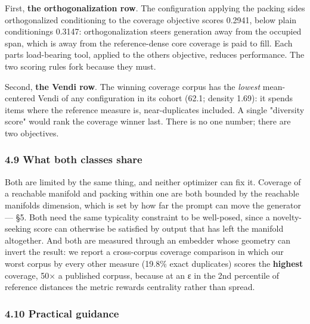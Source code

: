 \documentclass[
  10pt,
]{article}
\theoremstyle{plain}
\theoremstyle{definition}
\begin{document}
First, \textbf{the orthogonalization row}. The configuration applying
the packing side\textquotesingle s orthogonalized conditioning to the
coverage objective scores 0.2941, below plain
conditioning\textquotesingle s 0.3147: orthogonalization steers
generation away from the occupied span, which is away from the
reference-dense core coverage is paid to fill. Each
part\textquotesingle s load-bearing tool, applied to the
other\textquotesingle s objective, reduces performance. The two scoring
rules fork because they must.

Second, \textbf{the Vendi row}. The winning coverage corpus has the
\emph{lowest} mean-centered Vendi of any configuration in its cohort
(62.1; density 1.69): it spends items where the reference measure is,
near-duplicates included. A single "diversity score" would rank the
coverage winner last. There is no one number; there are two objectives.

\subsubsection{4.9 What both classes
share}\label{49-what-both-classes-share}

Both are limited by the same thing, and neither optimizer can fix it.
Coverage of a reachable manifold and packing within one are both bounded
by the reachable manifold\textquotesingle s dimension, which is set by
how far the prompt can move the generator --- §5. Both need the same
typicality constraint to be well-posed, since a novelty-seeking score
can otherwise be satisfied by output that has left the manifold
altogether. And both are measured through an embedder whose geometry can
invert the result: we report a cross-corpus coverage comparison in which
our worst corpus by every other measure (19.8\% exact duplicates) scores
the \textbf{highest} coverage, 50× a published corpus\textquotesingle s,
because at an ε in the 2nd percentile of reference distances the metric
rewards centrality rather than spread.

\subsubsection{4.10 Practical guidance}\label{410-practical-guidance}
\end{document}
